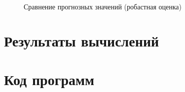 \begin{figure}[H]
\caption{Сравнение прогнозных значений (робастная оценка)}
\label{img:robust-best-cross-prediction}
\end{figure}

\newpage
\section{ Результаты вычислений}
\label{c:app_results}




\newpage
\section{ Код программ}
\label{c:listings}
\renewcommand{\thelstlisting}{D.1}

\renewcommand{\thelstlisting}{D.2}

\renewcommand{\thelstlisting}{D.3}
